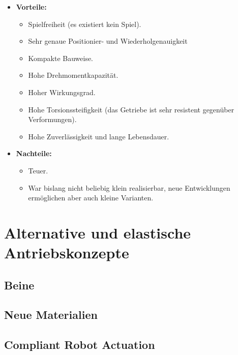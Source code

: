 				\begin{itemize}
					\item \textbf{Vorteile:}
						\begin{itemize}
							\item Spielfreiheit (\dh es existiert kein Spiel).
							\item Sehr genaue Positionier- und Wiederholgenauigkeit
							\item Kompakte Bauweise.
							\item Hohe Drehmomentkapazität.
							\item Hoher Wirkungsgrad.
							\item Hohe Torsionssteifigkeit (\dh das Getriebe ist sehr resistent gegenüber Verformungen).
							\item Hohe Zuverlässigkeit und lange Lebensdauer.
						\end{itemize}
					\item \textbf{Nachteile:}
						\begin{itemize}
							\item Teuer.
							\item War bislang nicht beliebig klein realisierbar, neue Entwicklungen ermöglichen aber auch kleine Varianten.
						\end{itemize}
				\end{itemize}

	\section{Alternative und elastische Antriebskonzepte} %

		\subsection{Beine} %

		\subsection{Neue Materialien} %

		\subsection{Compliant Robot Actuation} %

